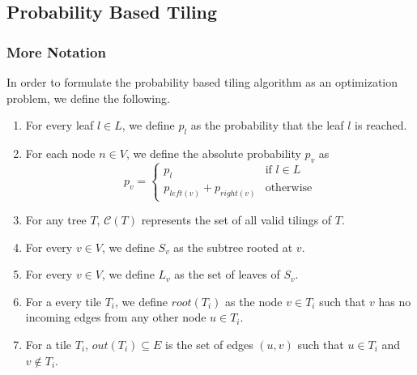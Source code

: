 \subsection{Probability Based Tiling}
\subsubsection{More Notation}
In order to formulate the probability based tiling algorithm as an optimization problem, we define the following.
\begin{enumerate}
    \item For every leaf $l \in L$, we define $p_l$ as the probability that the leaf $l$ is reached.
    \item For each node $n \in V$, we define the absolute probability $p_v$ as
    \begin{equation}
        p_v = \begin{cases}
        p_l &\text{if $l \in L$}\\
        p_{left(v)} + p_{right(v)} &\text{otherwise}
        \end{cases}
    \end{equation}
    \item For any tree $T$, $\mathcal{C}(T)$ represents the set of all valid tilings of $T$.
    \item For every $v \in V$, we define $S_v$ as the subtree rooted at $v$.
    \item For every $v \in V$, we define $L_v$ as the set of leaves of $S_v$.
    \item For a every tile $T_i$, we define $root(T_i)$ as the node $v \in T_i$ such that $v$ has no incoming edges from any other node $u \in T_i$.
    \item For a tile $T_i$, $out(T_i) \subseteq E$ is the set of edges $(u, v)$ such that $u \in T_i$ and $v \notin T_i$.
\end{enumerate}

\label{sec:ProbTiling}
